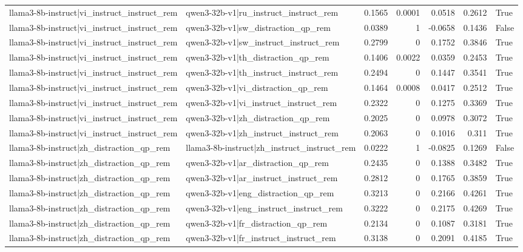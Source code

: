 \begin{table}
\begin{tabular}{l l r r r r l}
llama3-8b-instruct|vi_instruct_instruct_rem & qwen3-32b-v1|ru_instruct_instruct_rem & 0.1565 & 0.0001 & 0.0518 & 0.2612 & True \\
llama3-8b-instruct|vi_instruct_instruct_rem & qwen3-32b-v1|sw_distraction_qp_rem & 0.0389 & 1 & -0.0658 & 0.1436 & False \\
llama3-8b-instruct|vi_instruct_instruct_rem & qwen3-32b-v1|sw_instruct_instruct_rem & 0.2799 & 0 & 0.1752 & 0.3846 & True \\
llama3-8b-instruct|vi_instruct_instruct_rem & qwen3-32b-v1|th_distraction_qp_rem & 0.1406 & 0.0022 & 0.0359 & 0.2453 & True \\
llama3-8b-instruct|vi_instruct_instruct_rem & qwen3-32b-v1|th_instruct_instruct_rem & 0.2494 & 0 & 0.1447 & 0.3541 & True \\
llama3-8b-instruct|vi_instruct_instruct_rem & qwen3-32b-v1|vi_distraction_qp_rem & 0.1464 & 0.0008 & 0.0417 & 0.2512 & True \\
llama3-8b-instruct|vi_instruct_instruct_rem & qwen3-32b-v1|vi_instruct_instruct_rem & 0.2322 & 0 & 0.1275 & 0.3369 & True \\
llama3-8b-instruct|vi_instruct_instruct_rem & qwen3-32b-v1|zh_distraction_qp_rem & 0.2025 & 0 & 0.0978 & 0.3072 & True \\
llama3-8b-instruct|vi_instruct_instruct_rem & qwen3-32b-v1|zh_instruct_instruct_rem & 0.2063 & 0 & 0.1016 & 0.311 & True \\
llama3-8b-instruct|zh_distraction_qp_rem & llama3-8b-instruct|zh_instruct_instruct_rem & 0.0222 & 1 & -0.0825 & 0.1269 & False \\
llama3-8b-instruct|zh_distraction_qp_rem & qwen3-32b-v1|ar_distraction_qp_rem & 0.2435 & 0 & 0.1388 & 0.3482 & True \\
llama3-8b-instruct|zh_distraction_qp_rem & qwen3-32b-v1|ar_instruct_instruct_rem & 0.2812 & 0 & 0.1765 & 0.3859 & True \\
llama3-8b-instruct|zh_distraction_qp_rem & qwen3-32b-v1|eng_distraction_qp_rem & 0.3213 & 0 & 0.2166 & 0.4261 & True \\
llama3-8b-instruct|zh_distraction_qp_rem & qwen3-32b-v1|eng_instruct_instruct_rem & 0.3222 & 0 & 0.2175 & 0.4269 & True \\
llama3-8b-instruct|zh_distraction_qp_rem & qwen3-32b-v1|fr_distraction_qp_rem & 0.2134 & 0 & 0.1087 & 0.3181 & True \\
llama3-8b-instruct|zh_distraction_qp_rem & qwen3-32b-v1|fr_instruct_instruct_rem & 0.3138 & 0 & 0.2091 & 0.4185 & True \\

\end{tabular}
\end{table}
